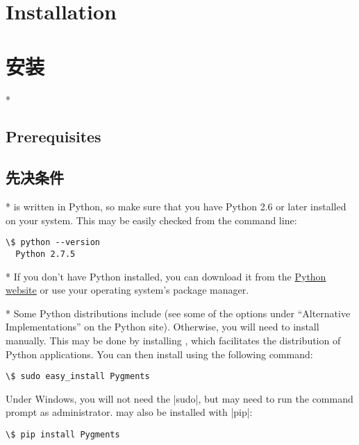 \begin{paracol}{2}
\section{Installation} 
\switchcolumn
\section{安装}
\switchcolumn[0]*%
\subsection{Prerequisites}
\switchcolumn
\subsection{先决条件}
\switchcolumn[0]*%
 is written in Python, so make sure that you have Python 2.6 or later installed on your system.  This may be easily checked from the command line:

\begin{Verbatim}[gobble=3,commandchars=\\\{\}]
  \$ python --version
  Python 2.7.5
\end{Verbatim}

\switchcolumn
\switchcolumn[0]*%
If you don't have Python installed, you can download it from the \href{http://www.python.org/download/}{Python website} or
use your operating system's package manager.

\switchcolumn
\switchcolumn[0]*%
Some Python distributions include  (see some of the options under ``Alternative Implementations'' on the Python site).  Otherwise, you will need to install  manually. This may  be done by installing \href{http://pypi.python.org/pypi/setuptools}{}, which facilitates the distribution of Python applications.  You can then install  using the following command:
\begin{Verbatim}[gobble=3,commandchars=\\\{\}]
  \$ sudo easy_install Pygments
\end{Verbatim}
Under Windows, you will not need the |sudo|, but may need to run the command prompt as administrator.   may also be installed with |pip|:
\begin{Verbatim}[gobble=3,commandchars=\\\{\}]
  \$ pip install Pygments
\end{Verbatim}


\end{paracol}
